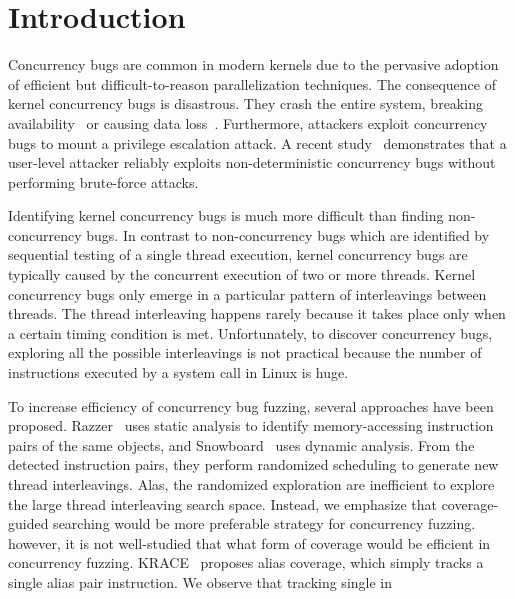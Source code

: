 \section{Introduction}
\label{s:intro}


Concurrency bugs are common in modern kernels due to 
the pervasive adoption of efficient but difficult-to-reason
parallelization techniques.
The consequence of kernel concurrency bugs is disastrous. They crash
the entire system, breaking availability~\cite{cve201812232, snowboardbug} or causing data loss~\cite{dataloss}.
Furthermore, attackers 
exploit concurrency bugs to mount a privilege escalation attack.
A recent study~\cite{exprace} demonstrates that a user-level attacker 
reliably exploits non-deterministic concurrency bugs without performing
brute-force attacks.

Identifying kernel concurrency bugs is much more difficult than 
finding non-concurrency bugs. 
In contrast to non-concurrency bugs which are identified by 
sequential testing of a single thread execution,
kernel concurrency bugs are typically caused by the concurrent execution 
of two or more threads.
Kernel concurrency bugs only emerge in a particular pattern of 
interleavings between threads. The thread interleaving happens 
rarely because it takes place only when a certain timing condition is met.
Unfortunately, to discover concurrency bugs, exploring all the possible interleavings is not practical because 
the number of instructions executed by a system call in Linux is huge.

To increase efficiency of concurrency bug fuzzing, several approaches
have been proposed.  Razzer~\cite{razzer} uses static analysis to 
identify memory-accessing instruction pairs of the same objects, and 
Snowboard~\cite{snowboard} uses dynamic analysis. 
From the detected instruction pairs, they perform randomized 
scheduling to generate new thread interleavings. Alas,
the randomized exploration are inefficient to explore the large 
thread interleaving search space. Instead, we emphasize that 
coverage-guided searching would be more preferable strategy 
for concurrency fuzzing. however, it is not well-studied that 
what form of coverage would be efficient in concurrency fuzzing.
KRACE~\cite{krace} proposes alias coverage, which simply tracks 
a single alias pair instruction. We observe that tracking single 
in


